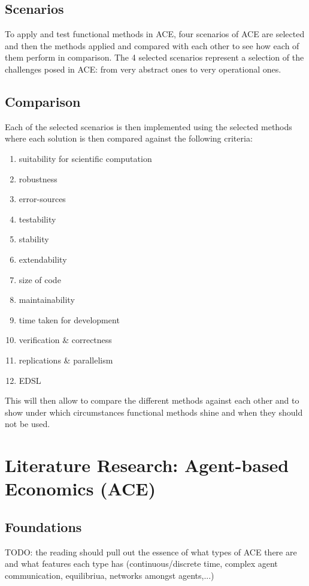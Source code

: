 \documentclass{article}
\begin{document}
\subsection{Scenarios}
To apply and test functional methods in ACE, four scenarios of ACE are selected and then the methods applied and compared with each other to see how each of them perform in comparison. The 4 selected scenarios represent a selection of the challenges posed in ACE: from very abstract ones to very operational ones.

\subsection{Comparison}
Each of the selected scenarios is then implemented using the selected methods where each solution is then compared against the following criteria: 

\begin{enumerate}
\item suitability for scientific computation
\item robustness
\item error-sources
\item testability
\item stability
\item extendability
\item size of code
\item maintainability
\item time taken for development
\item verification \& correctness
\item replications \& parallelism
\item EDSL
\end{enumerate}

This will then allow to compare the different methods against each other and to show under which circumstances functional methods shine and when they should not be used.


\section{Literature Research: Agent-based Economics (ACE)}

\subsection{Foundations}
TODO: the reading should pull out the essence of what types of ACE there are and what features each type has (continuous/discrete time, complex agent communication, equilibriua, networks amongst agents,...)
\end{document}
